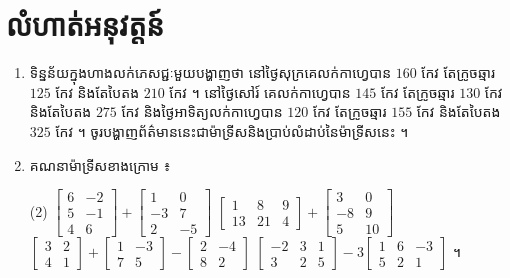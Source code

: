 \section*{លំហាត់អនុវត្តន៍}
\begin{enumerate}[1]
  \item ទិន្នន័យក្នុងហាងលក់ភេសជ្ជៈមួយបង្ហាញថា នៅថ្ងៃសុក្រគេលក់កាហ្វេបាន $160$ កែវ តែក្រូចឆ្មារ $125$ កែវ និងតែបៃតង $210$ កែវ ។ នៅថ្ងៃសៅរ៍ គេលក់កាហ្វេបាន $145$ កែវ តែក្រូចឆ្មារ $130$ កែវ និងតែបៃតង $275$ កែវ និងថ្ងៃអាទិត្យលក់កាហ្វេបាន $120$ កែវ តែក្រូចឆ្មារ $155$ កែវ និងតែបៃតង $325$ កែវ ។ ចូរបង្ហាញព័ត៌មាននេះជាម៉ាទ្រីសនិងប្រាប់លំដាប់នៃម៉ាទ្រីសនេះ ។
  \item គណនាម៉ាទ្រីសខាងក្រោម ៖
  \begin{tasks}(2)
    \task $\begin{bmatrix} 6 & -2\\ 5 & -1\\ 4 & 6 \end{bmatrix} + \begin{bmatrix} 1 & 0\\ -3 & 7\\ 2 & -5 \end{bmatrix}$
    \task $\begin{bmatrix} 1 & 8 & 9\\ 13 & 21 & 4 \end{bmatrix} + \begin{bmatrix} 3 & 0\\ -8 & 9\\ 5 & 10 \end{bmatrix}$
    \task $\begin{bmatrix} 3 & 2\\ 4 & 1 \end{bmatrix} + \begin{bmatrix} 1 & -3\\ 7 & 5 \end{bmatrix} - \begin{bmatrix} 2 & -4\\ 8 & 2 \end{bmatrix}$
    \task $\begin{bmatrix} -2 & 3 & 1\\ 3 & 2 & 5 \end{bmatrix} - 3\begin{bmatrix} 1 & 6 & -3\\ 5 & 2 & 1 \end{bmatrix}$ ។
  \end{tasks}

\end{enumerate}
